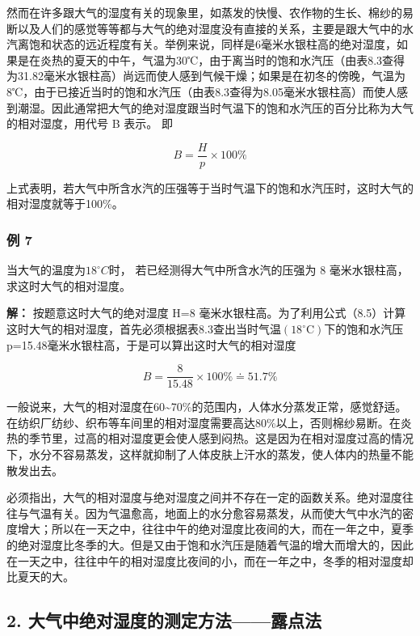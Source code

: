 然而在许多跟大气的湿度有关的现象里，如蒸发的快慢、农作物的生长、棉纱的易断以及人们的感觉等等都与大气的绝对湿度没有直接的关系，主要是跟大气中的水汽离饱和状态的远近程度有关。举例来说，同样是6毫米水银柱高的绝对湿度，如果是在炎热的夏天的中午，气温为30℃，由于离当时的饱和水汽压（由表8.3查得为31.82毫米水银柱高）尚远而使人感到气候干燥；如果是在初冬的傍晚，气温为8℃，由于已接近当时的饱和水汽压（由表8.3查得为8.05毫米水银柱高）而使人感到潮湿。因此通常把大气的绝对湿度跟当时气温下的饱和水汽压的百分比称为大气的相对湿度，用代号
B 表示。 即

\[
B = \frac {H}{p} \times 100 \% \tag{8.5}
\]

上式表明，若大气中所含水汽的压强等于当时气温下的饱和水汽压时，这时大气的相对湿度就等于100\%。

\subsubsection{例 7}\label{ux4f8b-7-3}

当大气的温度为\(18^{\circ}C\)时， 若已经测得大气中所含水汽的压强为 8
毫米水银柱高， 求这时大气的相对湿度。

\textbf{解：} 按题意这时大气的绝对湿度 H=8
毫米水银柱高。为了利用公式（8.5）计算这时大气的相对湿度，首先必须根据表8.3查出当时气温\((18^{\circ}\mathrm{C})\)下的饱和水汽压p=15.48毫米水银柱高，于是可以算出这时大气的相对湿度

\[
B = \frac {8}{15.48} \times 100 \% \doteq 51.7 \%
\]

一般说来，大气的相对湿度在60\textasciitilde70\%的范围内，人体水分蒸发正常，感觉舒适。在纺织厂纺纱、织布等车间里的相对湿度需要高达80\%以上，否则棉纱易断。在炎热的季节里，过高的相对湿度更会使人感到闷热。这是因为在相对湿度过高的情况下，水分不容易蒸发，这样就抑制了人体皮肤上汗水的蒸发，使人体内的热量不能散发出去。

必须指出，大气的相对湿度与绝对湿度之间并不存在一定的函数关系。绝对湿度往往与气温有关。因为气温愈高，地面上的水分愈容易蒸发，从而使大气中水汽的密度增大；所以在一天之中，往往中午的绝对湿度比夜间的大，而在一年之中，夏季的绝对湿度比冬季的大。但是又由于饱和水汽压是随着气温的增大而增大的，因此在一天之中，往往中午的相对湿度比夜间的小，而在一年之中，冬季的相对湿度却比夏天的大。

\subsection{2.
大气中绝对湿度的测定方法------露点法}\label{ux5927ux6c14ux4e2dux7eddux5bf9ux6e7fux5ea6ux7684ux6d4bux5b9aux65b9ux6cd5ux9732ux70b9ux6cd5}

